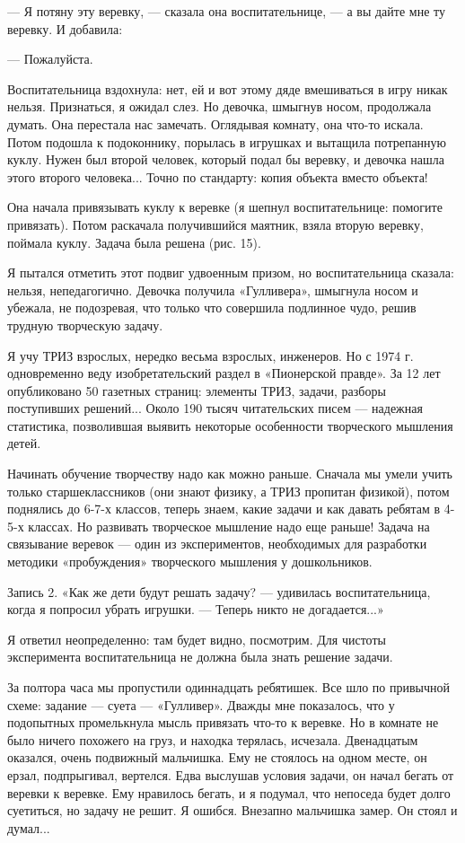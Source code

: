 — Я  потяну эту веревку, —  сказала она воспитательнице, —  а вы дайте
мне ту веревку. И добавила:

— Пожалуйста.

Воспитательница вздохнула: нет, ей и вот этому дяде вмешиваться в игру
никак нельзя.  Признаться, я ожидал  слез. Но девочка,  шмыгнув носом,
продолжала думать. Она перестала  нас замечать. Оглядывая комнату, она
что-то  искала. Потом  подошла к  подоконнику, порылась  в игрушках  и
вытащила потрепанную куклу. Нужен был второй человек, который подал бы
веревку, и девочка нашла этого второго человека... Точно по стандарту:
копия объекта вместо объекта!

Она  начала привязывать  куклу  к веревке  (я шепнул  воспитательнице:
помогите  привязать).  Потом  раскачала  получившийся  маятник,  взяла
вторую веревку, поймала куклу. Задача была решена (рис. 15).

Я пытался  отметить этот  подвиг удвоенным призом,  но воспитательница
сказала: нельзя, непедагогично. Девочка получила «Гулливера», шмыгнула
носом и  убежала, не  подозревая, что  только что  совершила подлинное
чудо, решив трудную творческую задачу.

Я учу ТРИЗ взрослых, нередко весьма  взрослых, инженеров. Но с 1974 г.
одновременно веду изобретательский раздел в «Пионерской правде». За 12
лет опубликовано  50 газетных страниц: элементы  ТРИЗ, задачи, разборы
поступивших решений...  Около 190 тысяч читательских  писем — надежная
статистика,  позволившая  выявить  некоторые  особенности  творческого
мышления детей.

Начинать обучение творчеству  надо как можно раньше.  Сначала мы умели
учить  только  старшеклассников (они  знают  физику,  а ТРИЗ  пропитан
физикой), потом поднялись до 6-7-х классов, теперь знаем, какие задачи
и как давать ребятам в 4-5-х классах. Но развивать творческое мышление
надо еще раньше! Задача на связывание веревок — один из экспериментов,
необходимых для разработки методики «пробуждения» творческого мышления
у дошкольников.

Запись   2.  «Как   же   дети  будут   решать   задачу?  —   удивилась
воспитательница, когда  я попросил убрать  игрушки. — Теперь  никто не
догадается...»

Я  ответил  неопределенно: там  будет  видно,  посмотрим. Для  чистоты
эксперимента воспитательница не должна была знать решение задачи.

За  полтора  часа мы  пропустили  одиннадцать  ребятишек. Все  шло  по
привычной схеме: задание — суета  — «Гулливер». Дважды мне показалось,
что у подопытных  промелькнула мысль привязать что-то к  веревке. Но в
комнате не было ничего похожего на груз, и находка терялась, исчезала.
Двенадцатым оказался,  очень подвижный  мальчишка. Ему не  стоялось на
одном месте,  он ерзал,  подпрыгивал, вертелся. Едва  выслушав условия
задачи, он начал бегать от веревки  к веревке. Ему нравилось бегать, и
я подумал, что  непоседа будет долго суетиться, но задачу  не решит. Я
ошибся. Внезапно мальчишка замер. Он стоял и думал...


